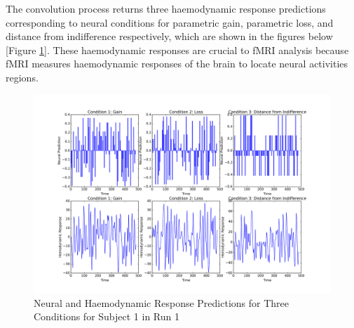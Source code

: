 \par \indent The convolution process returns three haemodynamic response 
predictions corresponding to neural conditions for parametric gain, parametric 
loss, and distance from indifference respectively, which are shown in the 
figures below [Figure \ref{fig:convolution}]. These haemodynamic responses are 
crucial to fMRI analysis because fMRI measures haemodynamic responses of the 
brain to locate neural activities regions. 

\begin{figure}[h!]
\centering
\includegraphics[width=120mm]{images/convolution3cond.png}
\caption{Neural and Haemodynamic Response Predictions for Three Conditions for
         Subject 1 in Run 1}
\label{fig:convolution}
\end{figure}
